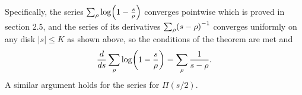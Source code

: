 \documentclass[12pt]{note}
\numberwithin{equation}{chapter}
\begin{document}
Specifically, the series $\sum_\rho\log\prn{1 - \frac{s}{\rho}}$ converges
pointwise which is proved in section 2.5, and the series of its derivatives
$\sum_\rho\prn{s - \rho}^{-1}$ converges uniformly on any disk $|s| \leq K$ as
shown above, so the conditions of the theorem are met and
\begin{equation*}
    \frac{d}{ds} \sum_\rho\log\prn{1 - \frac{s}{\rho}} = \sum_\rho\frac{1}{s -
        \rho}.
\end{equation*}
A similar argument holds for the series for $\Pi(s/2)$.





\end{document}

